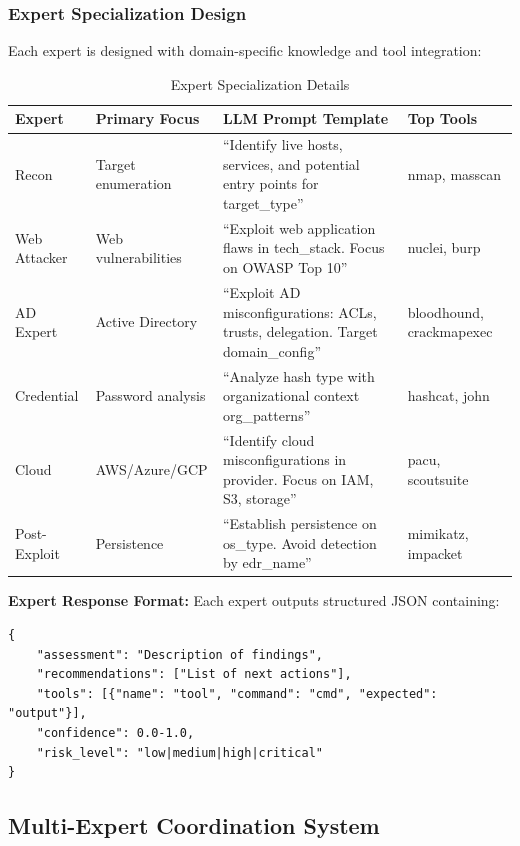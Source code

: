 \documentclass[preprint,12pt]{elsarticle}
\begin{document}
\subsubsection{Expert Specialization Design}

Each expert is designed with domain-specific knowledge and tool integration:

\begin{table}[htbp]
\centering
\caption{Expert Specialization Details}
\label{tab:expert_detail}
\begin{tabular}{p{2cm}p{3cm}p{3cm}p{2cm}}
\toprule
\textbf{Expert} & \textbf{Primary Focus} & \textbf{LLM Prompt Template} & \textbf{Top Tools} \\
\midrule
Recon & Target enumeration & ``Identify live hosts, services, and potential entry points for {target\_type}'' & nmap, masscan \\
Web Attacker & Web vulnerabilities & ``Exploit web application flaws in {tech\_stack}. Focus on OWASP Top 10'' & nuclei, burp \\
AD Expert & Active Directory & ``Exploit AD misconfigurations: ACLs, trusts, delegation. Target {domain\_config}'' & bloodhound, crackmapexec \\
Credential & Password analysis & ``Analyze hash {type} with organizational context {org\_patterns}'' & hashcat, john \\
Cloud & AWS/Azure/GCP & ``Identify cloud misconfigurations in {provider}. Focus on IAM, S3, storage'' & pacu, scoutsuite \\
Post-Exploit & Persistence & ``Establish persistence on {os\_type}. Avoid detection by {edr\_name}'' & mimikatz, impacket \\
\bottomrule
\end{tabular}
\end{table}

\textbf{Expert Response Format:} Each expert outputs structured JSON containing:
\begin{verbatim}
{
    "assessment": "Description of findings",
    "recommendations": ["List of next actions"],
    "tools": [{"name": "tool", "command": "cmd", "expected": "output"}],
    "confidence": 0.0-1.0,
    "risk_level": "low|medium|high|critical"
}
\end{verbatim}

\subsection{Multi-Expert Coordination System}
\end{document}
